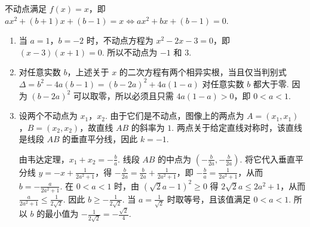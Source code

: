\begin{solution}
不动点满足 \(f(x)=x\)，即 \(ax^2+(b+1)x+(b-1)=x\Longleftrightarrow ax^2+bx+(b-1)=0\).

\begin{enumerate}
\item 当 \(a=1\)，\(b=-2\) 时，不动点方程为 \(x^2-2x-3=0\)，即 \((x-3)(x+1)=0\). 所以不动点为 \(-1\) 和 \(3\).

\item 对任意实数 \(b\)，上述关于 \(x\) 的二次方程有两个相异实根，当且仅当判别式 \(\Delta=b^2-4a(b-1)=(b-2a)^2+4a(1-a)\) 对任意实数 \(b\) 都大于零. 因为 \((b-2a)^2\) 可以取零，所以必须且只需 \(4a(1-a)>0\)，即 \(0<a<1\).

\item 设两个不动点为 \(x_1\)，\(x_2\). 由于它们是不动点，图像上的两点为 \(A=(x_1,x_1)\)，\(B=(x_2,x_2)\)，故直线 \(AB\) 的斜率为 \(1\). 两点关于给定直线对称时，该直线是线段 \(AB\) 的垂直平分线，因此 \(k=-1\).

由韦达定理，\(x_1+x_2=-\frac{b}{a}\).
线段 \(AB\) 的中点为 \(\left(-\frac{b}{2a},-\frac{b}{2a}\right)\). 将它代入垂直平分线 \(y=-x+\frac{1}{2a^2+1}\)，得 \(-\frac{b}{2a}=\frac{b}{2a}+\frac{1}{2a^2+1}\)，即 \(-\frac{b}{a}=\frac{1}{2a^2+1}\)，从而 \(b=-\frac{a}{2a^2+1}\).
在 \(0<a<1\) 时，由 \((\sqrt2a-1)^2\geqslant0\) 得 \(2\sqrt2a\leqslant2a^2+1\)，从而 \(\frac{a}{2a^2+1}\leqslant\frac{1}{2\sqrt2}\).
因此 \(b\geqslant-\frac{1}{2\sqrt2}\). 当 \(a=\frac1{\sqrt2}\) 时取等号，且该值满足 \(0<a<1\). 所以 \(b\) 的最小值为 \(-\frac{1}{2\sqrt2}=-\frac{\sqrt2}{4}\).
\end{enumerate}
\end{solution}
